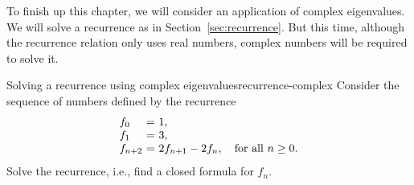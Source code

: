 To finish up this chapter, we will consider an application of complex
eigenvalues. We will solve a recurrence as in
Section~\ref{sec:recurrence}. But this time, although the recurrence
relation only uses real numbers, complex numbers will be required to
solve it.

\begin{example}{Solving a recurrence using complex eigenvalues}{recurrence-complex}
  Consider the sequence of numbers defined by the recurrence
  \begin{equation*}
    \begin{array}{l@{~}c@{~}l}
      f_0 &=& 1, \\
      f_1 &=& 3, \\
      f_{n+2} &=& 2f_{n+1} - 2f_{n}, \quad\mbox{for all $n\geq 0$.}\\
    \end{array}
  \end{equation*}
  Solve the recurrence, i.e., find a closed formula for $f_n$.
\end{example}

